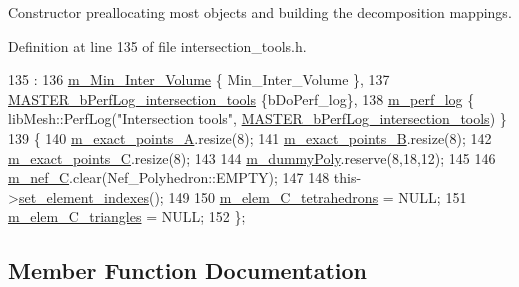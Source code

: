 Constructor preallocating most objects and building the decomposition mappings. 



Definition at line 135 of file intersection\+\_\+tools.\+h.


\begin{DoxyCode}
135                                                                                   :
136         \hyperlink{classcarl_1_1_intersection___tools_a931ecd3fd3103656ede9c84a2eed10d2}{m\_Min\_Inter\_Volume} \{ Min\_Inter\_Volume \},
137         \hyperlink{classcarl_1_1_intersection___tools_a651c43f074c2955bd58ef0d519c6ef73}{MASTER\_bPerfLog\_intersection\_tools} \{bDoPerf\_log\},
138         \hyperlink{classcarl_1_1_intersection___tools_afe18e6ca5fd12bae08efb98f69c71a48}{m\_perf\_log} \{ libMesh::PerfLog(\textcolor{stringliteral}{"Intersection tools"}, 
      \hyperlink{classcarl_1_1_intersection___tools_a651c43f074c2955bd58ef0d519c6ef73}{MASTER\_bPerfLog\_intersection\_tools}) \}
139     \{
140         \hyperlink{classcarl_1_1_intersection___tools_ad636117b292272044b252be62124eb0a}{m\_exact\_points\_A}.resize(8);
141         \hyperlink{classcarl_1_1_intersection___tools_a2c3b6211dd1f9b0aa5f2ac8ffc383182}{m\_exact\_points\_B}.resize(8);
142         \hyperlink{classcarl_1_1_intersection___tools_a473d6a254b10623659a1d8f81bbe695f}{m\_exact\_points\_C}.resize(8);
143 
144         \hyperlink{classcarl_1_1_intersection___tools_a1bc3cab10caf53e5de762c4dea2ef1ba}{m\_dummyPoly}.reserve(8,18,12);
145 
146         \hyperlink{classcarl_1_1_intersection___tools_adf2892a8902442fbfebb913e9a4fb8ac}{m\_nef\_C}.clear(Nef\_Polyhedron::EMPTY);
147 
148         this->\hyperlink{classcarl_1_1_intersection___tools_ac2eb9f8074d4dc2511b3f36d3cfd5f3b}{set\_element\_indexes}();
149 
150         \hyperlink{classcarl_1_1_intersection___tools_a2f6b6fff82b9a02400d3aeb3db1f4c82}{m\_elem\_C\_tetrahedrons} = NULL;
151         \hyperlink{classcarl_1_1_intersection___tools_a89a78135b49b49c32bec8be4016782b3}{m\_elem\_C\_triangles} = NULL;
152     \};
\end{DoxyCode}


\subsection{Member Function Documentation}
\hypertarget{classcarl_1_1_intersection___tools_a1d6303ff6ffc19b6df42626e29a507ce}{}
